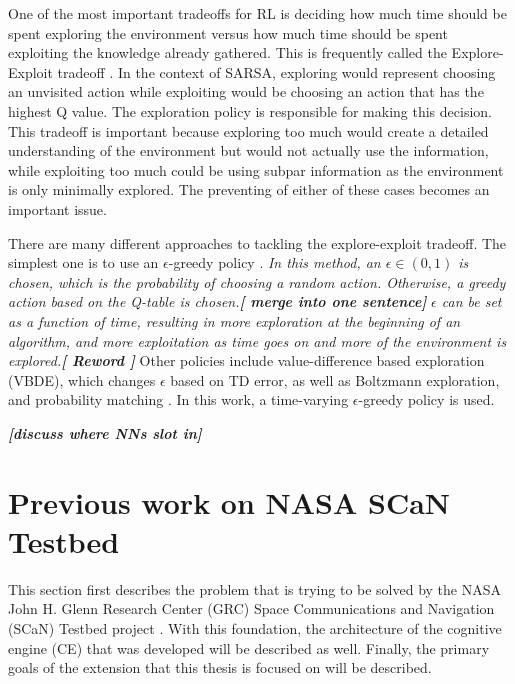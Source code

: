 	\par One of the most important tradeoffs for RL is deciding how much time should be spent exploring the environment versus how much time should be spent exploiting the knowledge already gathered. This is frequently called the Explore-Exploit tradeoff \cite{placeholderCitation}. In the context of SARSA, exploring would represent choosing an unvisited action while exploiting would be choosing an action that has the highest Q value. The exploration policy is responsible for making this decision. This tradeoff is important because exploring too much would create a detailed understanding of the environment but would not actually use the information, while exploiting too much could be using subpar information as the environment is only minimally explored. The preventing of either of these cases becomes an important issue. 
	\par There are many different approaches to tackling the explore-exploit tradeoff. The simplest one is to use an $\epsilon$-greedy policy \cite{placeholderCitation}. \textit{In this method, an $\epsilon \in (0,1)$ is chosen, which is the probability of choosing a random action. Otherwise, a greedy action based on the Q-table is chosen.\textbf{[ merge into one sentence]}}\cite{placeholderCitation} \textit{$\epsilon$ can be set as a function of time, resulting in more exploration at the beginning of an algorithm, and more exploitation as time goes on and more of the environment is explored.\textbf{[ Reword ]}} Other policies include value-difference based exploration (VBDE), which changes $\epsilon$ based on TD error, as well as Boltzmann exploration, and probability matching \cite{placeholderCitation}. In this work, a time-varying $\epsilon$-greedy policy is used. 
	\par \textit{\textbf{[discuss where NNs slot in]}}
	\section{Previous work on NASA SCaN Testbed}
	\par This section first describes the problem that is trying to be solved by the NASA John H. Glenn Research Center (GRC) Space Communications and Navigation (SCaN) Testbed project \cite{placeholderCitation}. With this foundation, the architecture of the cognitive engine (CE) that was developed will be described as well. Finally, the primary goals of the extension that this thesis is focused on will be described.
